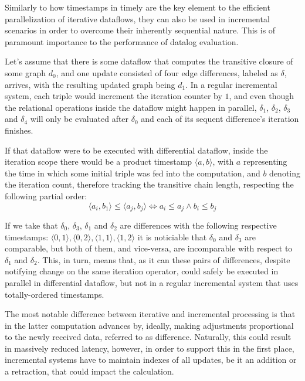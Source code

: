 \documentclass[manuscript,screen,review]{acmart}
\theoremstyle{definition}
\begin{document}
Similarly to how timestamps in timely are the key element to the efficient parallelization of iterative dataflows, they can also be used in incremental scenarios in order to
overcome their inherently sequential nature. This is of paramount importance to the performance of datalog evaluation.

Let's assume that there is some dataflow that computes the transitive closure of some graph $d_0$, and one update consisted of four edge differences, labeled as $\delta$, arrives, with
the resulting updated graph being $d_1$. In a regular incremental system, each triple would increment the iteration counter by $1$, and even though the relational operations inside
the dataflow might happen in parallel, $\delta_1$, $\delta_2$, $\delta_3$ and $\delta_4$ will only be evaluated after $\delta_0$ and each of its sequent difference's iteration finishes.

If that dataflow were to be executed with differential dataflow, inside the iteration scope there would be a product timestamp $\langle a, b \rangle$, with $a$ representing the time
in which some initial triple was fed into the computation, and $b$ denoting the iteration count, therefore tracking the transitive chain length, respecting the
following partial order: \[\langle a_i, b_1 \rangle \leq \langle a_j, b_j \rangle \iff a_i \leq a_j \wedge b_i \leq b_j\]

If we take that $\delta_0$, $\delta_3$, $\delta_1$ and $\delta_2$ are differences with the following respective timestamps: $\langle 0, 1 \rangle, \langle 0, 2 \rangle, \langle 1, 1 \rangle, \langle 1, 2 \rangle$ it
is noticiable that $\delta_0$ and $\delta_3$ are comparable, but both of them, and vice-versa, are incomparable with respect to $\delta_1$ and $\delta_2$. This, in turn, means that, as it can
these pairs of differences, despite notifying change on the same iteration operator, could safely be executed in parallel in differential dataflow, but not in a regular
incremental system that uses totally-ordered timestamps.

The most notable difference between iterative and incremental processing is that in the latter computation advances by, ideally, making adjustments proportional to the newly
received data, referred to as difference. Naturally, this could result in massively reduced latency, however, in order to support this in the first place, incremental
systems have to maintain indexes of all updates, be it an addition or a retraction, that could impact the calculation.
\end{document}
